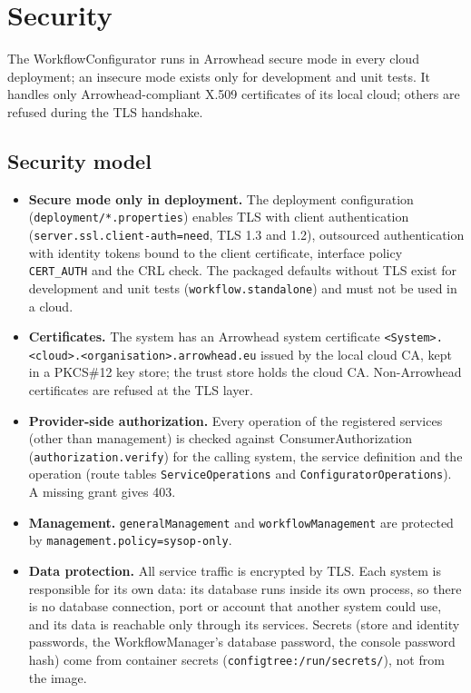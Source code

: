 \documentclass[a4paper]{arrowhead}
\begin{document}
\newpage
\section{Security}
\label{sec:security}
The WorkflowConfigurator runs in Arrowhead secure mode in every cloud deployment; an insecure mode exists only for development and
unit tests. It handles only Arrowhead-compliant X.509 certificates of its local cloud; others are refused during the
TLS handshake.

\subsection{Security model}
\begin{itemize}
\item \textbf{Secure mode only in deployment.} The deployment configuration (\texttt{deployment/\allowbreak{}*.\allowbreak{}properties}) enables
TLS with client authentication (\texttt{server.\allowbreak{}ssl.\allowbreak{}client-\allowbreak{}auth=\allowbreak{}need}, TLS 1.3 and 1.2), outsourced authentication with
identity tokens bound to the client certificate, interface policy \texttt{CERT\_AUTH} and the CRL check. The packaged
defaults without TLS exist for development and unit tests (\texttt{workflow.\allowbreak{}standalone}) and must not be used in a
cloud.
\item \textbf{Certificates.} The system has an Arrowhead system certificate
\texttt{<System>.\allowbreak{}<cloud>.\allowbreak{}<organisation>.\allowbreak{}arrowhead.\allowbreak{}eu} issued by the local cloud CA, kept in a PKCS\#12 key store; the
trust store holds the cloud CA. Non-Arrowhead certificates are refused at the TLS layer.
\item \textbf{Provider-side authorization.} Every operation of the registered services (other than management) is
checked against ConsumerAuthorization (\texttt{authorization.\allowbreak{}verify}) for the calling system, the service definition
and the operation (route tables \texttt{Service\allowbreak{}Operations} and \texttt{Configurator\allowbreak{}Operations}). A missing grant gives
403.
\item \textbf{Management.} \texttt{general\allowbreak{}Management} and \texttt{workflow\allowbreak{}Management} are protected by
\texttt{management.\allowbreak{}policy=\allowbreak{}sysop-\allowbreak{}only}.
\item \textbf{Data protection.} All service traffic is encrypted by TLS. Each system is responsible for its own data:
its database runs inside its own process, so there is no database connection, port or account that another system could
use, and its data is reachable only through its services. Secrets (store and identity passwords, the WorkflowManager's
database password, the console password hash) come from container secrets (\texttt{configtree:/\allowbreak{}run/\allowbreak{}secrets/}), not from
the image.
\end{itemize}
\end{document}
